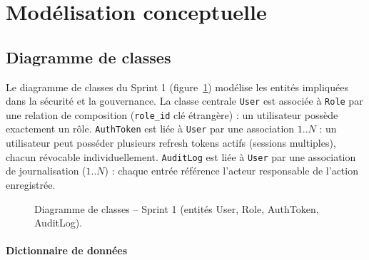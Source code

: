 \section{Modélisation conceptuelle}

\subsection{Diagramme de classes}

Le diagramme de classes du Sprint 1 (figure~\ref{fig:sprint1-class}) modélise les entités impliquées dans la sécurité et la gouvernance. La classe centrale \texttt{User} est associée à \texttt{Role} par une relation de composition (\texttt{role\_id} clé étrangère) : un utilisateur possède exactement un rôle. \texttt{AuthToken} est liée à \texttt{User} par une association \(1..N\) : un utilisateur peut posséder plusieurs refresh tokens actifs (sessions multiples), chacun révocable individuellement. \texttt{AuditLog} est liée à \texttt{User} par une association de journalisation (\(1..N\)) : chaque entrée référence l'acteur responsable de l'action enregistrée.

\begin{figure}[H]
\centering
\fbox{\rule{0pt}{2in}\rule{0.9\linewidth}{0pt}}
\caption{Diagramme de classes -- Sprint 1 (entités User, Role, AuthToken, AuditLog).}
\label{fig:sprint1-class}
\end{figure}

\paragraph{Dictionnaire de données}

